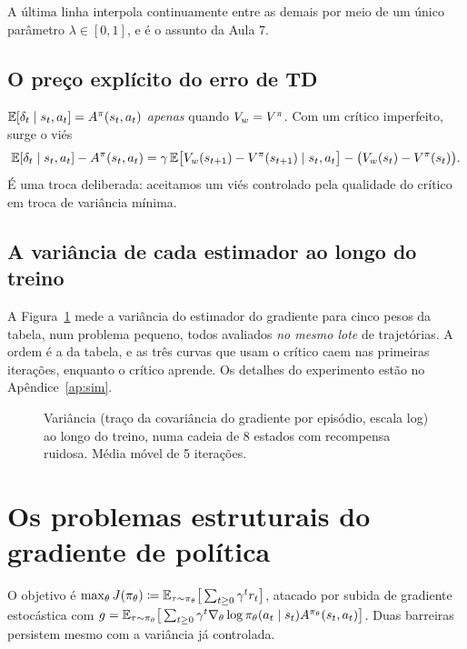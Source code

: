\documentclass[11pt, a4paper]{article}
\newcommand{\Adv}{A}
\begin{document}
\medskip
A última linha interpola continuamente entre as demais por meio de um único
parâmetro $\lambda \in [0,1]$, e é o assunto da Aula 7.

\subsection{O preço explícito do erro de TD}

$\E[\delta_t \mid s_t,a_t] = \Adv^{\pol}(s_t,a_t)$ \emph{apenas} quando
$V_w = V^{\pi}$. Com um crítico imperfeito, surge o viés
\[
  \E[\delta_t\mid s_t,a_t] - \Adv^{\pol}(s_t,a_t)
  = \gamma\,\E\big[V_w(s_{t+1}) - \Vpi(s_{t+1})\mid s_t,a_t\big]
    - \big(V_w(s_t)-\Vpi(s_t)\big).
\]
É uma troca deliberada: aceitamos um viés controlado pela qualidade do crítico em
troca de variância mínima.

\subsection{A variância de cada estimador ao longo do treino}

A Figura~\ref{fig:variancia-treino} mede a variância do estimador do gradiente
para cinco pesos da tabela, num problema pequeno, todos avaliados \emph{no
mesmo lote} de trajetórias. A ordem é a da tabela, e as três curvas que usam o
crítico caem nas primeiras iterações, enquanto o crítico aprende. Os detalhes do
experimento estão no Apêndice~\ref{ap:sim}.

\begin{figure}[h]
  \centering
  
  \caption{Variância (traço da covariância do gradiente por episódio, escala log)
  ao longo do treino, numa cadeia de 8 estados com recompensa ruidosa. Média
  móvel de 5 iterações.}
  \label{fig:variancia-treino}
\end{figure}

\section{Os problemas estruturais do gradiente de política}

O objetivo é
$\max_\theta J(\pi_\theta) \coloneqq \mathbb{E}_{\tau\sim\pi_\theta}\big[\sum_{t\ge 0}\gamma^t r_t\big]$,
atacado por subida de gradiente estocástica com
$g = \E_{\tau\sim\pol_\theta}\big[\sum_{t\ge 0}\gamma^t
\nabla_\theta \log \pol_\theta(a_t\mid s_t)\Adv^{\pol_\theta}(s_t,a_t)\big]$.
Duas barreiras persistem mesmo com a variância já controlada.
\end{document}
